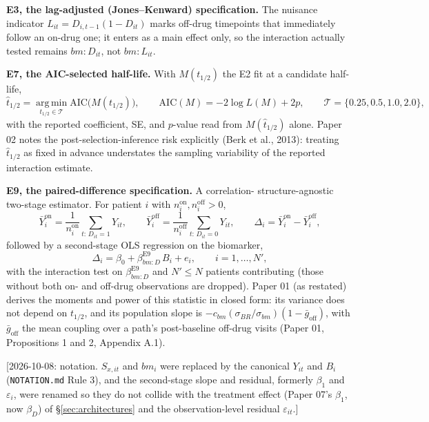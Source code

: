 \documentclass[11pt]{article}
\newcommand{\note}[1]{\textcolor{blue!60!black}{\small [#1]}}
\newcommand{\code}[1]{\texttt{#1}}
\begin{document}
\textbf{E3, the lag-adjusted (Jones--Kenward) specification.} The
nuisance indicator $L_{it} = D_{i,t-1}(1-D_{it})$ marks off-drug
timepoints that immediately follow an on-drug one; it enters as a main
effect only, so the interaction actually tested remains
$bm{:}D_{it}$, not $bm{:}L_{it}$.

\textbf{E7, the AIC-selected half-life.} With $M(t_{1/2})$ the E2 fit
at a candidate half-life,
\begin{equation}
\hat t_{1/2} = \operatorname*{arg\,min}_{t_{1/2}\in\mathcal T}
  \mathrm{AIC}\big(M(t_{1/2})\big), \qquad \mathrm{AIC}(M) =
  -2\log L(M) + 2p, \qquad \mathcal T = \{0.25, 0.5, 1.0, 2.0\},
\label{eq:e7-aic}
\end{equation}
with the reported coefficient, SE, and $p$-value read from
$M(\hat t_{1/2})$ alone. Paper 02 notes the post-selection-inference
risk explicitly (Berk et al., 2013): treating $\hat t_{1/2}$ as fixed
in advance understates the sampling variability of the reported
interaction estimate.

\textbf{E9, the paired-difference specification.} A correlation-
structure-agnostic two-stage estimator. For patient $i$ with
$n_i^{\mathrm{on}}, n_i^{\mathrm{off}} > 0$,
\begin{equation}
\bar Y_{i}^{\mathrm{on}} = \frac{1}{n_i^{\mathrm{on}}}
  \sum_{t:\,D_{it}=1} Y_{it}, \qquad
\bar Y_{i}^{\mathrm{off}} = \frac{1}{n_i^{\mathrm{off}}}
  \sum_{t:\,D_{it}=0} Y_{it}, \qquad
\Delta_i = \bar Y_{i}^{\mathrm{on}} - \bar Y_{i}^{\mathrm{off}},
\label{eq:e9-diffs}
\end{equation}
followed by a second-stage OLS regression on the biomarker,
\begin{equation}
\Delta_i = \beta_0 + \beta_{bm:D}^{\mathrm{E9}}\, B_i + e_i, \qquad i =
  1,\dots,N',
\label{eq:e9-ols}
\end{equation}
with the interaction test on $\beta_{bm:D}^{\mathrm{E9}}$ and
$N' \le N$ patients contributing (those without both on- and off-drug
observations are dropped). Paper 01 (as restated) derives the moments
and power of this statistic in closed form: its variance does not
depend on $t_{1/2}$, and its population slope is
$-c_{bm}(\sigma_{BR}/\sigma_{bm})(1 - \bar g_{\mathrm{off}})$, with
$\bar g_{\mathrm{off}}$ the mean coupling over a path's post-baseline
off-drug visits (Paper 01, Propositions 1 and 2, Appendix A.1).

\note{2026-10-08: notation. $S_{x,it}$ and $bm_i$ were replaced by the
canonical $Y_{it}$ and $B_i$ (\code{NOTATION.md} Rule 3), and the
second-stage slope and residual, formerly $\beta_1$ and
$\varepsilon_i$, were renamed so they do not collide with the
treatment effect (Paper 07's $\beta_1$, now $\beta_D$) of \S\ref{sec:architectures} and the
observation-level residual $\varepsilon_{it}$.}
\end{document}
